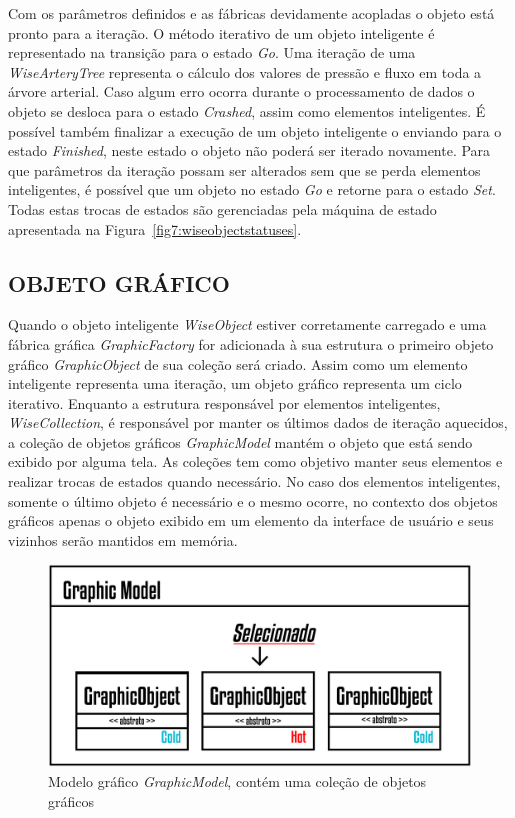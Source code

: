 Com os parâmetros definidos e as fábricas devidamente acopladas o objeto está pronto para a iteração. O método iterativo de um objeto inteligente é representado na transição para o estado \textit{Go}. Uma iteração de uma \textit{WiseArteryTree} representa o cálculo dos valores de pressão e fluxo em toda a árvore arterial. Caso algum erro ocorra durante o processamento de dados o objeto se desloca para o estado \textit{Crashed}, assim como elementos inteligentes. É possível também finalizar a execução de um objeto inteligente o enviando para o estado \textit{Finished}, neste estado o objeto não poderá ser iterado novamente. Para que parâmetros da iteração possam ser alterados sem que se perda elementos inteligentes, é possível que um objeto no estado \textit{Go} e retorne para o estado \textit{Set}. Todas estas trocas de estados são gerenciadas pela máquina de estado apresentada na Figura~\ref{fig7:wiseobjectstatuses}.

\subsection{OBJETO GRÁFICO}\label{sec:objeto_grafico}


Quando o objeto inteligente \textit{WiseObject} estiver corretamente carregado e uma fábrica gráfica \textit{GraphicFactory} for adicionada à sua estrutura o primeiro objeto gráfico \textit{GraphicObject} de sua coleção será criado. Assim como um elemento inteligente representa uma iteração, um objeto gráfico representa um ciclo iterativo. Enquanto a estrutura responsável por elementos inteligentes, \textit{WiseCollection}, é responsável por manter os últimos dados de iteração aquecidos, a coleção de objetos gráficos \textit{GraphicModel} mantém o objeto que está sendo exibido por alguma tela. As coleções tem como objetivo manter seus elementos e realizar trocas de estados quando necessário. No caso dos elementos inteligentes, somente o último objeto é necessário e o mesmo ocorre, no contexto dos objetos gráficos apenas o objeto exibido em um elemento da interface de usuário e seus vizinhos serão mantidos em memória.

\begin{figure}[!htbp]
	\centering
	\includegraphics[scale=2]{Figures/GraphicModel@16x.png}
	\caption{Modelo gráfico \textit{GraphicModel}, contém uma coleção de objetos gráficos}
	\label{fig7:graphicmodel}
\end{figure}

